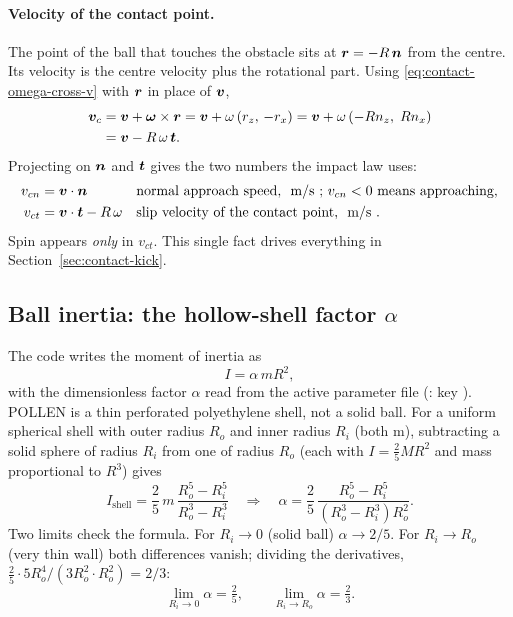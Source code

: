 \paragraph{Velocity of the contact point.}
The point of the ball that touches the obstacle sits at $\bm{r}=-R\,\bm{n}$ from the centre.
Its velocity is the centre velocity plus the rotational part. Using
\eqref{eq:contact-omega-cross-v} with $\bm{r}$ in place of $\bm{v}$,
\begin{align}
  \bm{v}_c &= \bm{v} + \bm{\omega}\times\bm{r}
  = \bm{v} + \omega\,(r_z,\,-r_x)
  = \bm{v} + \omega\,(-R n_z,\; R n_x) \nonumber\\
  &= \bm{v} - R\,\omega\,\bm{t}.
  \label{eq:contact-contact-velocity}
\end{align}
Projecting on $\bm{n}$ and $\bm{t}$ gives the two numbers the impact law uses:
\begin{align}
  v_{cn} &= \vect{v}\cdot\vect{n}
  && \text{normal approach speed, \unit{m/s}; } v_{cn}<0 \text{ means approaching,}
  \label{eq:contact-vcn}\\
  v_{ct} &= \vect{v}\cdot\vect{t} - R\,\omega
  && \text{slip velocity of the contact point, \unit{m/s}.}
  \label{eq:contact-vct}
\end{align}
Spin appears \emph{only} in $v_{ct}$. This single fact drives everything in
Section~\ref{sec:contact-kick}.

\subsection{Ball inertia: the hollow-shell factor \texorpdfstring{$\alpha$}{alpha}}
\label{sec:contact-alpha}

The code writes the moment of inertia as
\begin{equation}
  I = \alpha\, m R^2 ,
  \label{eq:contact-alpha}
\end{equation}
with the dimensionless factor $\alpha$ read from the active parameter file
(: key ). POLLEN is a thin perforated
polyethylene shell, not a solid ball. For a uniform spherical shell with outer radius $R_o$ and
inner radius $R_i$ (both \unit{m}), subtracting a solid sphere of radius $R_i$ from one of
radius $R_o$ (each with $I=\tfrac{2}{5}MR^2$ and mass proportional to $R^3$) gives
\begin{equation}
  I_{\text{shell}} = \frac{2}{5}\,m\,\frac{R_o^5-R_i^5}{R_o^3-R_i^3}
  \quad\Longrightarrow\quad
  \alpha = \frac{2}{5}\,\frac{R_o^5-R_i^5}{\left(R_o^3-R_i^3\right)R_o^2}.
  \label{eq:contact-shell}
\end{equation}
Two limits check the formula. For $R_i\to 0$ (solid ball) $\alpha\to 2/5$. For
$R_i\to R_o$ (very thin wall) both differences vanish; dividing the derivatives,
$\tfrac{2}{5}\cdot 5R_o^4/(3R_o^2\cdot R_o^2) = 2/3$:
\begin{equation}
  \lim_{R_i\to0}\alpha = \tfrac{2}{5},
  \qquad
  \lim_{R_i\to R_o}\alpha = \tfrac{2}{3}.
  \label{eq:contact-alpha-limits}
\end{equation}


